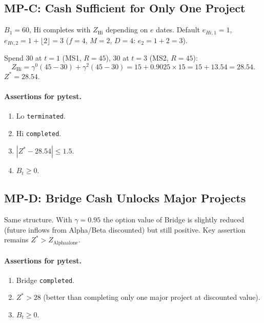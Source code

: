 \documentclass[11pt, a4paper]{article}
\begin{document}
\subsection{MP-C: Cash Sufficient for Only One Project}

$B_1=60$, Hi completes with $Z_{\mathrm{Hi}}$ depending on $e$ dates.
Default $e_{Hi,1}=1$, $e_{Hi,2}=1+\lfloor2\rfloor=3$ ($f=4$, $M=2$,
$D=4$: $e_2=1+2=3$).

Spend 30 at $t=1$ (MS1, $R=45$), 30 at $t=3$ (MS2, $R=45$):
\[
  Z_{\mathrm{Hi}} = \gamma^0(45-30)+\gamma^2(45-30)
      = 15+0.9025\times15 = 15+13.54 = \mathbf{28.54}.
\]
$Z^*=28.54$.

\paragraph{Assertions for pytest.}
\begin{enumerate}[label=A\arabic*.]
  \item Lo \texttt{terminated}.
  \item Hi \texttt{completed}.
  \item $|Z^*-28.54|\leq1.5$.
  \item $B_t\geq0$.
\end{enumerate}

\subsection{MP-D: Bridge Cash Unlocks Major Projects}

Same structure. With $\gamma=0.95$ the option value of Bridge is
slightly reduced (future inflows from Alpha/Beta discounted) but still
positive. Key assertion remains $Z^*>Z_{\mathrm{Alpha alone}}$.

\paragraph{Assertions for pytest.}
\begin{enumerate}[label=A\arabic*.]
  \item Bridge \texttt{completed}.
  \item $Z^*>28$ (better than completing only one major project at
    discounted value).
  \item $B_t\geq0$.
\end{enumerate}
\end{document}
